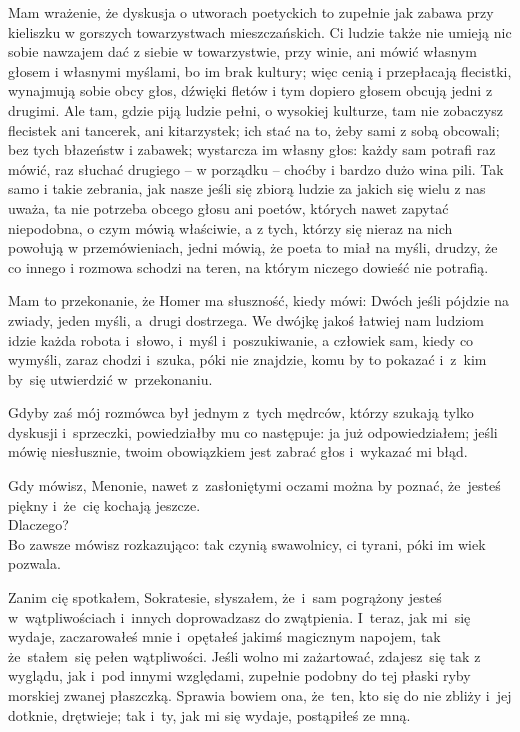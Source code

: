 Mam wrażenie, że dyskusja o utworach poetyckich to zupełnie jak zabawa
przy kieliszku w gorszych towarzystwach mieszczańskich. Ci ludzie
także nie umieją nic sobie nawzajem dać z siebie w towarzystwie, przy
winie, ani mówić własnym głosem i własnymi myślami, bo im brak
kultury; więc cenią i przepłacają flecistki, wynajmują sobie obcy
głos, dźwięki fletów i tym dopiero głosem obcują jedni z drugimi. Ale
tam, gdzie piją ludzie pełni, o wysokiej kulturze, tam nie zobaczysz
flecistek ani tancerek, ani kitarzystek; ich stać na to, żeby sami z
sobą obcowali; bez tych błazeństw i zabawek; wystarcza im własny głos:
każdy sam potrafi raz mówić, raz słuchać drugiego -- w porządku --
choćby i bardzo dużo wina pili. Tak samo i takie zebrania, jak nasze
jeśli się zbiorą ludzie za jakich się wielu z nas uważa, ta nie
potrzeba obcego głosu ani poetów, których nawet zapytać niepodobna, o
czym mówią właściwie, a z tych, którzy się nieraz na nich powołują w
przemówieniach, jedni mówią, że poeta to miał na myśli, drudzy, że co
innego i rozmowa schodzi na teren, na którym niczego dowieść nie
potrafią.


\noi Mam to przekonanie, że Homer ma słuszność, kiedy mówi: Dwóch
jeśli pójdzie na zwiady, jeden myśli, a~drugi dostrzega. We dwójkę
jakoś łatwiej nam ludziom idzie każda robota i~słowo, i~myśl
i~poszukiwanie, a człowiek sam, kiedy co wymyśli, zaraz chodzi
i~szuka, póki nie znajdzie, komu by to pokazać i~z~kim by~się
utwierdzić w~przekonaniu.



\noi Gdyby zaś mój rozmówca był jednym z~tych mędrców, którzy szukają
tylko dyskusji i~sprzeczki, powiedziałby mu co następuje: ja już
odpowiedziałem; jeśli mówię niesłusznie, twoim obowiązkiem jest zabrać
głos i~wykazać mi błąd.


\noi {} Gdy mówisz, Menonie, nawet z~zasłoniętymi oczami
można by
poznać, że~jesteś piękny i~że~cię kochają jeszcze. \\
 Dlaczego? \\
 Bo zawsze mówisz rozkazująco: tak czynią swawolnicy, ci
tyrani, póki im wiek pozwala.


\noi Zanim cię spotkałem, Sokratesie, słyszałem, że~i~sam pogrążony
jesteś w~wątpliwościach i~innych doprowadzasz do zwątpienia. I~teraz,
jak mi~się wydaje, zaczarowałeś mnie i~opętałeś jakimś magicznym
napojem, tak że~stałem~się pełen wątpliwości. Jeśli wolno mi
zażartować, zdajesz~się tak z wyglądu, jak i~pod innymi względami,
zupełnie podobny do tej płaski ryby morskiej zwanej płaszczką. Sprawia
bowiem ona, że~ten, kto się do nie zbliży i~jej dotknie, drętwieje;
tak i~ty, jak mi się wydaje, postąpiłeś ze mną.


